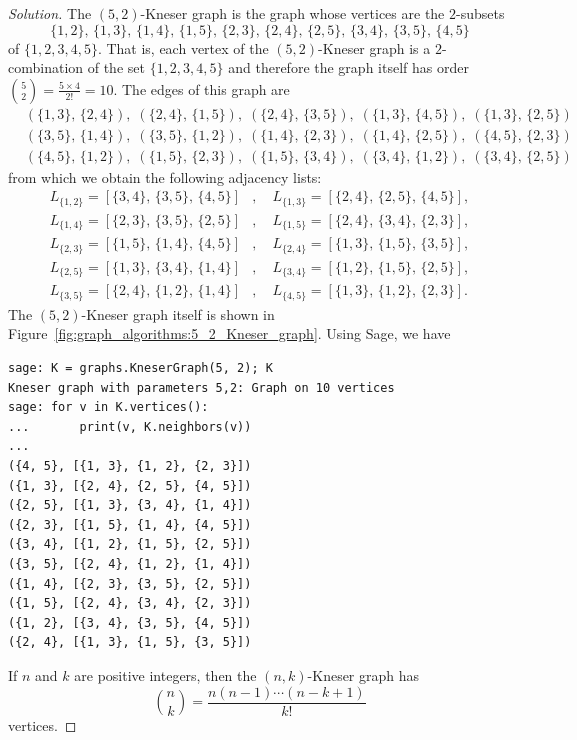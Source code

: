 \begin{proof}[Solution]
The $(5,2)$-Kneser graph is the graph whose
vertices are the $2$-subsets
\[
\{1,2\},\, \{1,3\},\, \{1,4\},\, \{1,5\},\,
\{2,3\},\, \{2,4\},\, \{2,5\},\,
\{3,4\},\, \{3,5\},\,
\{4,5\}
\]
of $\{1, 2, 3, 4, 5\}$. That is, each vertex of the
$(5,2)$-Kneser graph is a $2$-combination of the
set $\{1, 2, 3, 4, 5\}$ and therefore the graph itself has order
$\binom{5}{2} = \frac{5 \times 4}{2!} = 10$. The edges of this graph
are
\begin{align*}
& (\{1,3\},\, \{2,4\}),\;
  (\{2,4\},\, \{1,5\}),\;
  (\{2,4\},\, \{3,5\}),\;
  (\{1,3\},\, \{4,5\}),\;
  (\{1,3\},\, \{2,5\}) \\[4pt]
& (\{3,5\},\, \{1,4\}),\;
  (\{3,5\},\, \{1,2\}),\;
  (\{1,4\},\, \{2,3\}),\;
  (\{1,4\},\, \{2,5\}),\;
  (\{4,5\},\, \{2,3\}) \\[4pt]
& (\{4,5\},\, \{1,2\}),\;
  (\{1,5\},\, \{2,3\}),\;
  (\{1,5\},\, \{3,4\}),\;
  (\{3,4\},\, \{1,2\}),\;
  (\{3,4\},\, \{2,5\})
\end{align*}
from which we obtain the following adjacency lists:
\begin{align*}
L_{\{1,2\}} = [\{3,4\},\, \{3,5\},\, \{4,5\}]
&,\quad
L_{\{1,3\}} = [\{2,4\},\, \{2,5\},\, \{4,5\}], \\[4pt]
L_{\{1,4\}} = [\{2,3\},\, \{3,5\},\, \{2,5\}]
&,\quad
L_{\{1,5\}} = [\{2,4\},\, \{3,4\},\, \{2,3\}], \\[4pt]
L_{\{2,3\}} = [\{1,5\},\, \{1,4\},\, \{4,5\}]
&,\quad
L_{\{2,4\}} = [\{1,3\},\, \{1,5\},\, \{3,5\}], \\[4pt]
L_{\{2,5\}} = [\{1,3\},\, \{3,4\},\, \{1,4\}]
&,\quad
L_{\{3,4\}} = [\{1,2\},\, \{1,5\},\, \{2,5\}], \\[4pt]
L_{\{3,5\}} = [\{2,4\},\, \{1,2\},\, \{1,4\}]
&,\quad
L_{\{4,5\}} = [\{1,3\},\, \{1,2\},\, \{2,3\}].
\end{align*}
The $(5,2)$-Kneser graph itself is shown in
Figure~\ref{fig:graph_algorithms:5_2_Kneser_graph}. Using Sage, we
have
\begin{lstlisting}
sage: K = graphs.KneserGraph(5, 2); K
Kneser graph with parameters 5,2: Graph on 10 vertices
sage: for v in K.vertices():
...       print(v, K.neighbors(v))
...
({4, 5}, [{1, 3}, {1, 2}, {2, 3}])
({1, 3}, [{2, 4}, {2, 5}, {4, 5}])
({2, 5}, [{1, 3}, {3, 4}, {1, 4}])
({2, 3}, [{1, 5}, {1, 4}, {4, 5}])
({3, 4}, [{1, 2}, {1, 5}, {2, 5}])
({3, 5}, [{2, 4}, {1, 2}, {1, 4}])
({1, 4}, [{2, 3}, {3, 5}, {2, 5}])
({1, 5}, [{2, 4}, {3, 4}, {2, 3}])
({1, 2}, [{3, 4}, {3, 5}, {4, 5}])
({2, 4}, [{1, 3}, {1, 5}, {3, 5}])
\end{lstlisting}
If $n$ and $k$ are positive integers, then the
$(n,k)$-Kneser graph has
\[
\binom{n}{k}
=
\frac{n (n-1) \cdots (n - k + 1)} {k!}
\]
vertices.
\end{proof}

